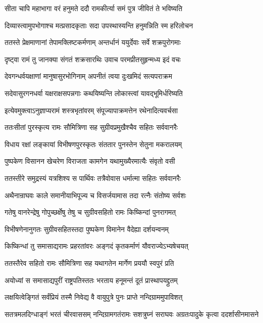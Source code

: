 \twolineshloka
{सीता चापि महाभागा वरं हनुमते ददौ}
{रामकीर्त्या समं पुत्र जीवितं ते भविष्यति}


\twolineshloka
{दिव्यास्त्वामुपभोगाश्च मत्प्रसादकृताः सदा}
{उपस्थास्यन्ति हनुमन्निति स्म हरिलोचन}


\twolineshloka
{ततस्ते प्रेक्षमाणानां तेपामक्लिष्टकर्मणाम्}
{अन्तर्धानं ययुर्देवाः सर्वे शक्रपुरोगमाः}


\twolineshloka
{दृष्ट्वा रामं तु जानक्या संगतं शक्रसारथिः}
{उवाच परमप्रीतसुहृन्मध्य इदं वचः}


\twolineshloka
{देवगन्धर्वयक्षाणां मानुषासुरभोगिनाम्}
{अपनीतं त्वया दुःखमिदं सत्यपराक्रम}


\twolineshloka
{सदेवासुरगनधर्वा यक्षराक्षसपन्नगाः}
{कथयिष्यन्ति लोकास्त्वां यावद्भूमिर्धरिष्यति}


\twolineshloka
{इत्येवमुक्त्वाऽनुज्ञाप्यरामं शस्त्रभृतांवरम्}
{संपूज्यापाक्रमत्तेन रथेनादित्यवर्चसा}


\twolineshloka
{ततःसीतां पुरस्कृत्य रामः सौमित्रिणा सह}
{सुग्रीवप्रमुखैश्चैव सहितः सर्ववानरैः}


\twolineshloka
{विधाय रक्षां लङ्कायां विभीषणपुरस्कृतः}
{संततार पुनस्तेन सेतुना मकरालयम्}


\twolineshloka
{पुष्पकेण विसानन खेचरेण विराजता}
{कामगेन यथामुख्यैरमात्यैः संवृतो वसी}


\twolineshloka
{ततस्तीरे समुद्रस्यं यत्रशिश्य स पार्थिवः}
{तत्रैवोवास धर्मात्मा सहितः सर्ववानरैः}


\twolineshloka
{अथैनान्राघवः काले समानीयाभिपूज्य च}
{विसर्जयामास तदा रत्नैः संतोष्य सर्वशः}


\twolineshloka
{गतेषु वानरेन्द्रेषु गोपुच्छर्क्षेषु तेषु च}
{सुग्रीवसहितो रामः किष्किन्दां पुनरागमत्}


\twolineshloka
{विभीषणेनानुगतः सुग्रीवसहितस्तदा}
{पुष्पकेण विमानेन वैदेह्या दर्शयन्वनम्}


\twolineshloka
{किष्किन्धां तु समासाद्यरामः प्रहरतांवरः}
{अङ्गदं कृतकर्माणं यौवराज्येऽभ्यषेचयत्}


\twolineshloka
{ततस्तैरेव सहितो रामः सौमित्रिणा सह}
{यथागतेन मार्गेण प्रययौ स्वपुरं प्रति}


\twolineshloka
{अयोध्यां स समासाद्यपुरीं राष्ट्रपतिस्ततः}
{भरताय हनूमन्तं दूतं प्रास्थापयद्द्रुतम्}


\twolineshloka
{लक्षयित्वेङ्गितं सर्वंप्रियं तस्मै निवेद्य वै}
{वायुपुत्रे पुनः प्राप्ते नन्दिग्राममुपाविशत्}


\threelineshloka
{सतत्रमलदिग्धाङ्गं भरतं चीरवाससम्}
{नन्दिग्रामगतंरामः सशत्रुघ्नं सराघवः}
{अग्रतःपादुके कृत्वा ददर्शासीनमासने}


